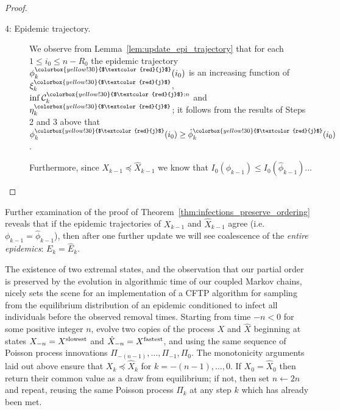 \documentclass[]{article}
\newcommand{\Conditioned}{\mathcal{C}}
\newcommand{\Epidemic}{E}%
\newcommand{\Epi}{X}
\newcommand{\Poisson}{\Pi}
\newcommand{\faster}[1]{\hat{#1}}
\newcommand{\slower}[1]{#1}
\newcommand{\Slowest}[1][]{{}^{\textup{slowest}#1}}
\newcommand{\Fastest}[1][]{{}^{\textup{fastest}#1}}
\newcommand{\infectee}{{\colorbox{yellow!30}{$\textcolor{red}{j}$}}}
\begin{document}
\begin{proof}
\begin{description}
	\item[4: Epidemic trajectory.] We observe from Lemma~\ref{lem:update_epi_trajectory} that for each \(1\le i_0\le n-R_0\) the epidemic trajectory \(\phi^\infectee_k(i_0)\) is an increasing function of \(\xi^\infectee_k\), \(\inf\Conditioned^{\infectee:n}_k\) and \(\eta^\infectee_k\); it follows from the results of Steps 2 and 3 above that \(\slower{\phi}^\infectee_k(i_0)\ge \faster{\phi}^\infectee_k(i_0)\). 
	
	Furthermore, since \(\slower{\Epi}_{k-1} \preceq \faster{\Epi}_{k-1}\) we know that \(I_0(\slower{\phi}_{k-1}) \le  I_0(\faster{\phi}_{k-1})\)...
	
\end{description}
\end{proof}

\begin{rem}
	Further examination of the proof of Theorem~\ref{thm:infections_preserve_ordering} reveals that if the epidemic trajectories of \(\slower{\Epi}_{k-1}\) and \(\faster{\Epi}_{k-1}\) agree (i.e. \(\slower{\phi}_{k-1} = \faster{\phi}_{k-1}\)), then after one further update we will see coalescence of the \emph{entire epidemics}: \(\slower{\Epidemic}_k = \faster{\Epidemic}_k\). 
\end{rem}

The existence of two extremal states, and the observation that our partial order is preserved by the evolution in algorithmic time of our coupled Markov chains, nicely sets the scene for an implementation of a CFTP algorithm for sampling from the equilibrium distribution of an epidemic conditioned to infect all individuals before the observed removal times. Starting from time \(-n<0\) for some positive integer \(n\), evolve two copies of the process \(\slower\Epi\) and \(\faster\Epi\) beginning at states \(\slower\Epi_{-n} = \Epi\Slowest\) and \(\faster\Epi_{-n} = \Epi\Fastest\), and using the same sequence of Poisson process innovations \(\Poisson_{-(n-1)},\dots,\Poisson_{-1},\Poisson_0\). The monotonicity arguments laid out above ensure that \(\slower\Epi_k \preceq \faster\Epi_k\) for \(k=-(n-1),\dots,0\). If \(\slower\Epi_0 = \faster\Epi_0\) then return their common value as a draw from equilibrium; if not, then set $n\leftarrow 2n$ and repeat, reusing the same Poisson process \(\Poisson_k\) at any step \(k\) which has already been met. 
\end{document}
